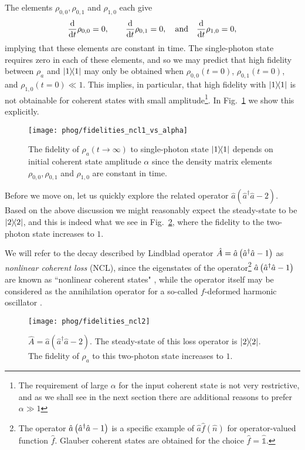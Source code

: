 \noindent The elements $\rho_{0, 0}, \rho_{0, 1}$ and $\rho_{1, 0}$ each give
\begin{equation}
\ddt \rho_{0,0} = 0, \qq{} \ddt \rho_{0, 1} = 0, \qq{and} \ddt\rho_{1, 0} = 0,
\end{equation}
implying that these elements are constant in time. The single-photon state requires zero in each of these elements, and so we may predict that high fidelity between $\rho_a$ and $\dyad{1}$ may only be obtained when $\rho_{0,0}\left(t=0\right)$, $\rho_{0, 1}\left(t=0\right)$, and $\rho_{1, 0}\left(t=0\right) \ll 1$. This implies, in particular, that high fidelity with $\dyad{1}$ is not obtainable for coherent states with small amplitude\footnote{The requirement of large $\alpha$ for the input coherent state is not very restrictive, and as we shall see in the next section there are additional reasons to prefer $\alpha \gg 1$}. In Fig.~\ref{fig:phog_fidelity_ncl_vs_alpha} we show this explicitly.

\begin{figure}[htp]
\captionsetup{width=0.8\linewidth}
\centering
\texttt{[image: phog/fidelities\_ncl1\_vs\_alpha]}
\caption{\label{fig:phog_fidelity_ncl_vs_alpha} The fidelity of $\rho_a\left(t\rightarrow\infty\right)$ to single-photon state $\dyad{1}$ depends on initial coherent state amplitude $\alpha$ since the density matrix elements $\rho_{0, 0}, \rho_{0, 1}$ and $\rho_{1, 0}$ are constant in time. %
}
\end{figure}




Before we move on, let us quickly explore the related operator $\hat{a}\left(\hat{a}^\dagger \hat{a} -2\right)$. Based on the above discussion we might reasonably expect the steady-state to be $\dyad{2}$, and this is indeed what we see in Fig.~\ref{fig:phog_A_ncl2}, where the fidelity to the two-photon state increases to $1$. 

We will refer to the decay described by Lindblad operator $\hat{A} = \hat{a}\left(\hat{a}^\dagger \hat{a} - 1\right)$ as \emph{nonlinear coherent loss} (NCL), since the eigenstates of the operator\footnote{The operator $\hat{a}\left(\hat{a}^\dagger \hat{a} - 1\right)$ is a specific example of $\hat{a} \hat{f}\left(\hat{n}\right)$ for operator-valued function $\hat{f}$. Glauber coherent states are obtained for the choice $\hat{f} = \hat{\mathds{1}}$.}
 $\hat{a}\left(\hat{a}^\dagger \hat{a} - 1\right)$ are known as ``nonlinear coherent states" \cite{Manko1997}, while the operator itself may be considered as the annihilation operator for a so-called $f$-deformed harmonic oscillator \cite{Filho1996}.
\begin{figure}[htp]
\captionsetup{width=0.8\linewidth}
\centering
\texttt{[image: phog/fidelities\_ncl2]}
\caption{\label{fig:phog_A_ncl2} $\hat{A} = \hat{a}\left(\hat{a}^\dagger \hat{a} - 2\right)$. The steady-state of this loss operator is $\dyad{2}$. The fidelity of $\rho_a$ to this two-photon state increases to $1$.}
\end{figure}



